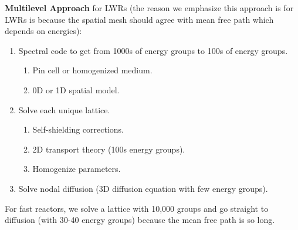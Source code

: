 \documentclass{school-22.211-notes}
\begin{document}
\textbf{Multilevel Approach} for LWRs (the reason we emphasize this approach is for LWRs is because the spatial mesh should agree with mean free path which depends on energies):
\begin{enumerate}
\item Spectral code to get from 1000s of energy groups to 100s of energy groups. 
  \begin{enumerate}
    \item Pin cell or homogenized medium. 
    \item 0D or 1D spatial model.
  \end{enumerate}

\item Solve each unique lattice. 
  \begin{enumerate}
  \item Self-shielding corrections. 
  \item 2D transport theory (100s energy groups). 
  \item Homogenize parameters.
  \end{enumerate}

\item Solve nodal diffusion (3D diffusion equation with few energy groups). 
\end{enumerate}
For fast reactors, we solve a lattice with 10,000 groups and go straight to diffusion (with 30-40 energy groups) because the mean free path is so long. 
\end{document}

